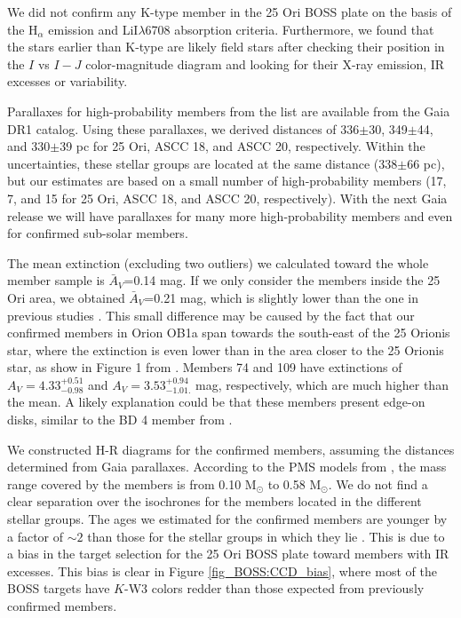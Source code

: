 \documentclass[12pt]{article}
\begin{document}
We did not confirm any K-type member in the 25 Ori BOSS plate on the basis of the H$_\alpha$ emission and LiI$\lambda$6708 absorption criteria. Furthermore, we found that the stars earlier than K-type are likely field stars after checking their position in the $I$ vs $I-J$ color-magnitude diagram and looking for their X-ray emission, IR excesses or variability.

Parallaxes for high-probability members from the \citet{Kharchenko2005} list are available from the Gaia DR1 catalog. Using these parallaxes, we derived distances of 336$\pm$30, 349$\pm$44, and 330$\pm$39 pc for 25 Ori, ASCC 18, and ASCC 20, respectively. Within the uncertainties, these stellar groups are located at the same distance (338$\pm$66 pc), but our estimates are based on a small number of high-probability members (17, 7, and 15 for 25 Ori, ASCC 18, and ASCC 20, respectively). With the next Gaia release we will have parallaxes for many more high-probability members and even for confirmed sub-solar members. 

The mean extinction (excluding two outliers) we calculated toward the whole member sample is $\bar{A}_V$=0.14 mag. If we only consider the members inside the 25 Ori area, we obtained $\bar{A}_V$=0.21 mag, which is slightly lower than the one in previous studies \citep[0.27 mag, 0.28 mag, 0.29 mag, and 0.30 mag by ][]{Kharchenko2005, Briceno2005, Briceno2007, Downes2014}. This small difference may be caused by the fact that our confirmed members in Orion OB1a span towards the south-east of the 25 Orionis star, where the \citet{Schlegel1998} extinction is even lower than in the area closer to the 25 Orionis star, as show in Figure 1 from \citet{Downes2014}. Members 74 and 109 have extinctions of $A_V=4.33^{+0.51}_{-0.98}$ and $A_V=3.53^{+0.94}_{-1.01.}$ mag, respectively, which are much higher than the mean. A likely explanation could be that these members present edge-on disks, similar to the BD 4 member from \citet{Downes2015}.

We constructed H-R diagrams for the confirmed members, assuming the distances determined from Gaia parallaxes. According to the PMS models from \citet{Baraffe2015}, the mass range covered by the members is from 0.10 M$_\odot$ to 0.58 M$_\odot$. We do not find a clear separation over the isochrones for the members located in the different stellar groups. The ages we estimated for the confirmed members are younger by a factor of $\sim 2$ than those for the stellar groups in which they lie \citep{Kharchenko2005,Briceno2005,Briceno2007,Kharchenko2013,Downes2014}. This is due to a bias in the target selection for the 25 Ori BOSS plate toward members with IR excesses. This bias is clear in Figure \ref{fig_BOSS:CCD_bias}, where most of the BOSS targets have $K$-W3 colors redder than those expected from previously confirmed members. 
\end{document}
